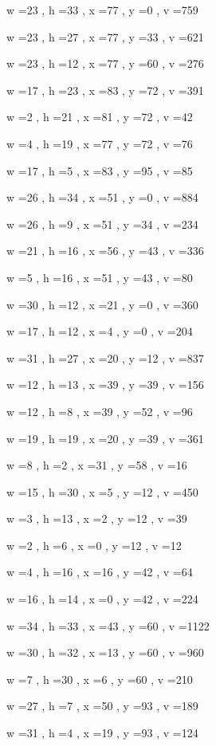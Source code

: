 \documentclass[11pt]{article}
\begin{document}
w =23 , h =33 , x =77 , y =0 , v =759
\par
w =23 , h =27 , x =77 , y =33 , v =621
\par
w =23 , h =12 , x =77 , y =60 , v =276
\par
w =17 , h =23 , x =83 , y =72 , v =391
\par
w =2 , h =21 , x =81 , y =72 , v =42
\par
w =4 , h =19 , x =77 , y =72 , v =76
\par
w =17 , h =5 , x =83 , y =95 , v =85
\par
w =26 , h =34 , x =51 , y =0 , v =884
\par
w =26 , h =9 , x =51 , y =34 , v =234
\par
w =21 , h =16 , x =56 , y =43 , v =336
\par
w =5 , h =16 , x =51 , y =43 , v =80
\par
w =30 , h =12 , x =21 , y =0 , v =360
\par
w =17 , h =12 , x =4 , y =0 , v =204
\par
w =31 , h =27 , x =20 , y =12 , v =837
\par
w =12 , h =13 , x =39 , y =39 , v =156
\par
w =12 , h =8 , x =39 , y =52 , v =96
\par
w =19 , h =19 , x =20 , y =39 , v =361
\par
w =8 , h =2 , x =31 , y =58 , v =16
\par
w =15 , h =30 , x =5 , y =12 , v =450
\par
w =3 , h =13 , x =2 , y =12 , v =39
\par
w =2 , h =6 , x =0 , y =12 , v =12
\par
w =4 , h =16 , x =16 , y =42 , v =64
\par
w =16 , h =14 , x =0 , y =42 , v =224
\par
w =34 , h =33 , x =43 , y =60 , v =1122
\par
w =30 , h =32 , x =13 , y =60 , v =960
\par
w =7 , h =30 , x =6 , y =60 , v =210
\par
w =27 , h =7 , x =50 , y =93 , v =189
\par
w =31 , h =4 , x =19 , y =93 , v =124
\par
\newpage


\end{document}
